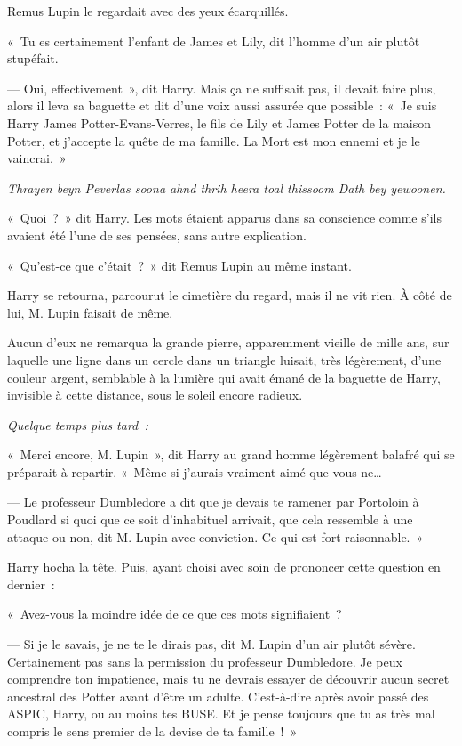 Remus Lupin le regardait avec des yeux écarquillés.

«~Tu es certainement l'enfant de James et Lily, dit l'homme d'un air plutôt stupéfait.

--- Oui, effectivement~», dit Harry.
Mais ça ne suffisait pas, il devait faire plus, alors il leva sa baguette et dit d'une voix aussi assurée que possible~: «~Je suis Harry James Potter-Evans-Verres, le fils de Lily et James Potter de la maison Potter, et j'accepte la quête de ma famille.
La Mort est mon ennemi et je le vaincrai.~»

\emph{Thrayen beyn Peverlas soona ahnd thrih heera toal thissoom Dath bey yewoonen.}

«~Quoi~?~»
dit Harry.
Les mots étaient apparus dans sa conscience comme s'ils avaient été l'une de ses pensées, sans autre explication.

«~Qu'est-ce que c'était~?~»
dit Remus Lupin au même instant.

Harry se retourna, parcourut le cimetière du regard, mais il ne vit rien.
À côté de lui, M. Lupin faisait de même.

Aucun d'eux ne remarqua la grande pierre, apparemment vieille de mille ans, sur laquelle une ligne dans un cercle dans un triangle luisait, très légèrement, d'une couleur argent, semblable à la lumière qui avait émané de la baguette de Harry, invisible à cette distance, sous le soleil encore radieux.

\later

\emph{Quelque temps plus tard~:}

«~Merci encore, M. Lupin~», dit Harry au grand homme légèrement balafré qui se préparait à repartir.
«~Même si j'aurais vraiment aimé que vous ne…

--- Le professeur Dumbledore a dit que je devais te ramener par Portoloin à Poudlard si quoi que ce soit d'inhabituel arrivait, que cela ressemble à une attaque ou non, dit M. Lupin avec conviction.
Ce qui est fort raisonnable.~»

Harry hocha la tête.
Puis, ayant choisi avec soin de prononcer cette question en dernier~:

«~Avez-vous la moindre idée de ce que ces mots signifiaient~?

--- Si je le savais, je ne te le dirais pas, dit M. Lupin d'un air plutôt sévère.
Certainement pas sans la permission du professeur Dumbledore.
Je peux comprendre ton impatience, mais tu ne devrais essayer de découvrir aucun secret ancestral des Potter avant d'être un adulte.
C'est-à-dire après avoir passé des ASPIC, Harry, ou au moins tes BUSE.
Et je pense toujours que tu as très mal compris le sens premier de la devise de ta famille~!~»

